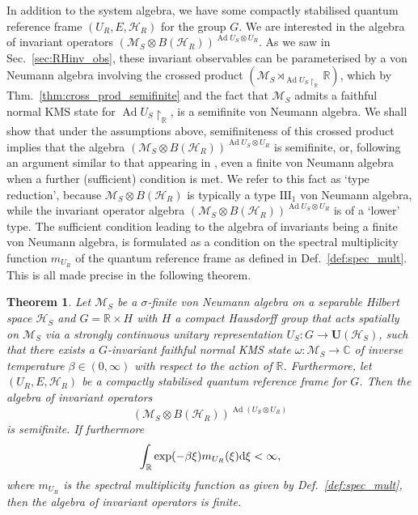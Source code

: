 \documentclass[sn-mathphys-num]{sn-jnl}%
\newcommand{\CC}{\mathbb{C}}
\newcommand{\RR}{\mathbb{R}}
\newcommand{\HH}{\mathcal{H}}
\newcommand{\MM}{\mathcal{M}}
\DeclareMathOperator{\Ad}{Ad}
\newcommand{\diff}{\textup{d}}
\numberwithin{equation}{section}
\theoremstyle{thmstyleone}%
\newtheorem{theorem}{Theorem}[section]%
\theoremstyle{thmstyletwo}%
\theoremstyle{thmstylethree}%
\begin{document}
In addition to the system algebra, we have some compactly stabilised quantum reference frame $(U_R,E,\HH_R)$ for the group $G$. We are interested in the algebra of invariant operators $(\MM_S\otimes B(\HH_R))^{\Ad U_S\otimes U_R}$. As we saw in Sec.\ \ref{sec:RHinv_obs}, these invariant observables can be parameterised by a von Neumann algebra involving the crossed product $(\MM_S\rtimes_{\Ad U_S\restriction_\RR}\RR)$, which by Thm.\ \ref{thm:cross_prod_semifinite} and the fact that $\MM_S$ admits a faithful normal KMS state for $\Ad U_S\restriction_\RR$, is a semifinite von Neumann algebra. We shall show that under the assumptions above, semifiniteness of this crossed product implies that the algebra $(\MM_S\otimes B(\HH_R))^{\Ad U_S\otimes U_R}$ is semifinite, or, following an argument similar to that appearing in \cite{chandrasekaran2023algebra}, even a finite von Neumann algebra when a further (sufficient) condition is met. We refer to this fact as `type reduction', because $\MM_S\otimes B(\HH_R)$ is typically a type $\mathrm{III}_1$ von Neumann algebra, while the invariant operator algebra $(\MM_S\otimes B(\HH_R))^{\Ad U_S\otimes U_R}$ is of a `lower' type. The sufficient condition leading to the algebra of invariants being a finite von Neumann algebra, is formulated as a condition on the spectral multiplicity function $m_{U_R}$ of the quantum reference frame as defined in Def.\ \ref{def:spec_mult}. This is all made precise in the following theorem.
\begin{theorem}
\label{thm:type_change}
    Let $\MM_S$ be a $\sigma$-finite von Neumann algebra on a separable Hilbert space $\HH_S$ and $G=\RR\times H$ with $H$ a compact Hausdorff group that acts spatially on $\MM_S$ via a strongly continuous unitary representation $U_S:G\to\mathbf{U}(\HH_S)$, 
    such that there exists a $G$-invariant faithful normal KMS state $\omega:\MM_S\to \CC$ of inverse temperature $\beta\in (0,\infty)$ with respect to the action of $\RR$. Furthermore, let $(U_R,E,\HH_R)$ be a compactly stabilised quantum reference frame for $G$. Then the algebra of invariant operators
    \begin{equation}
        \left(\MM_S\otimes B(\HH_R)\right)^{\Ad(U_S\otimes U_R)}
    \end{equation} is semifinite. If furthermore
    \begin{equation}
        \label{eq:type_change_condition}
        \int_\RR\exp(-\beta\xi)m_{U_R}(\xi)\diff\xi<\infty,
    \end{equation}
    where $m_{U_R}$ is the spectral multiplicity function as given by Def.\ \ref{def:spec_mult}, then the algebra of invariant operators is finite.
\end{theorem}
\end{document}
